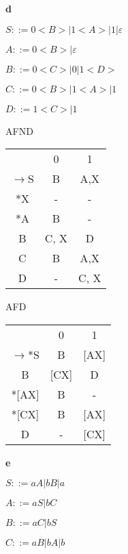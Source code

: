 \documentclass[ ]{article}
\begin{document}
		\newpage
		\textbf{d} %
		
		$S::= 0<B> | 1<A> | 1 | \varepsilon$
		
		$A::= 0<B> | \varepsilon$
		
		$B::= 0<C> | 0 | 1<D>$
		
		$C::= 0<B> | 1<A> | 1$
		
		$D::= 1<C> | 1$
		
		\begin{center}
		AFND\\
		
		\begin{tabular}{ c c c }
  & 0 & 1 \\ 
 $\to$S & B & A,X \\  
 *X & - & - \\
 *A & B & - \\
 B & C, X & D\\
 C& B & A,X\\
 D & - & C, X
		\end{tabular}
		\end{center}
		
		\begin{center}
		AFD\\
		
		\begin{tabular}{ c c c }
   & 0 & 1 \\ 
 $\to$*S & B & [AX] \\  
 B & [CX] & D\\
 *[AX] & B & - \\
 *[CX] & B & [AX]\\
 D & - & [CX]
 		\end{tabular}
		\end{center}
	\newpage
		\textbf{e}
		
		$S ::= aA | bB | a$
		
		$A ::= aS | bC$
		
		$B ::= aC | bS$
		
		$C ::= aB | bA | b$
		
\end{document}
